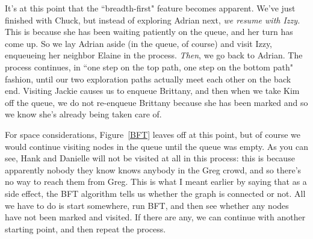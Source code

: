 It's at this point that the ``breadth-first" feature becomes apparent.
We've just finished with Chuck, but instead of exploring Adrian next,
\textit{we resume with Izzy.} This is because she has been waiting
patiently on the queue, and her turn has come up. So we lay Adrian aside
(in the queue, of course) and visit Izzy, enqueueing her neighbor Elaine in
the process. \textit{Then}, we go back to Adrian. The process continues, in
``one step on the top path, one step on the bottom path" fashion, until our
two exploration paths actually meet each other on the back end. Visiting
Jackie causes us to enqueue Brittany, and then when we take Kim off the
queue, we do not re-enqueue Brittany because she has been marked and so we
know she's already being taken care of. 

For space considerations, Figure~\ref{BFT} leaves off at this point, but of
course we would continue visiting nodes in the queue until the queue was
empty. As you can see, Hank and Danielle will not be visited at all in this
process: this is because apparently nobody they know knows anybody in the
Greg crowd, and so there's no way to reach them from Greg. This is what I
meant earlier by saying that as a side effect, the BFT algorithm tells us
whether the graph is connected or not. All we have to do is start
somewhere, run BFT, and then see whether any nodes have not been marked and
visited. If there are any, we can continue with another starting point, and
then repeat the process.


